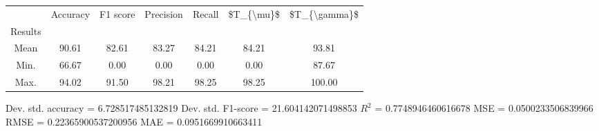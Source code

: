 \begin{tabular}{|c|c|c|c|c|c|c|}
\toprule
{} &  Accuracy &  F1 score &  Precision &  Recall &  \$T\_\{\textbackslash mu\}\$ &  \$T\_\{\textbackslash gamma\}\$ \\
Results &           &           &            &         &            &               \\
\hline
Mean    &     90.61 &     82.61 &      83.27 &   84.21 &      84.21 &         93.81 \\
Min.    &     66.67 &      0.00 &       0.00 &    0.00 &       0.00 &         87.67 \\
Max.    &     94.02 &     91.50 &      98.21 &   98.25 &      98.25 &        100.00 \\
\bottomrule
\end{tabular}

 Dev. std. accuracy = 6.728517485132819
 Dev. std. F1-score = 21.604142071498853
 $R^2$ = 0.7748946460616678
 MSE = 0.0500233506839966
 RMSE = 0.22365900537200956
 MAE = 0.0951669910663411